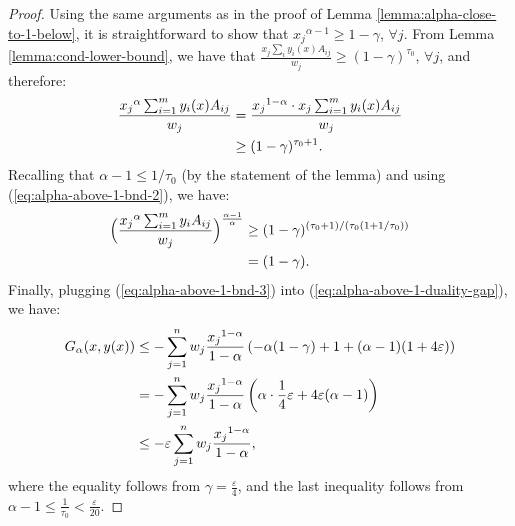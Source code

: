 \documentclass[11pt]{article}
\begin{document}
\begin{proof}
Using the same arguments as in the proof of Lemma \ref{lemma:alpha-close-to-1-below}, it is straightforward to show that ${x_j}^{\alpha-1}\geq 1-\gamma$, $\forall j$. From Lemma \ref{lemma:cond-lower-bound}, we have that $\frac{x_j\sum_{i}y_i(x)A_{ij}}{w_j}\geq (1-\gamma)^{\tau_0}$, $\forall j$, and therefore:
\begin{align}
\frac{{x_j}^{\alpha}\sum_{i=1}^m y_i(x)A_{ij}}{w_j} &= \frac{{x_j}^{1-\alpha}\cdot x_j\sum_{i=1}^my_i(x)A_{ij}}{w_j}\notag\\ 
&\geq (1-\gamma)^{\tau_0 + 1}. \label{eq:alpha-above-1-bnd-2}
\end{align}
Recalling that $\alpha - 1 \leq 1/\tau_0$ (by the statement of the lemma) and using (\ref{eq:alpha-above-1-bnd-2}), we have:
\begin{align}
\Big(\frac{{x_j}^{\alpha}\sum_{i=1}^m y_i A_{ij}}{w_j}\Big)^{\frac{\alpha-1}{\alpha}} &\geq (1-\gamma)^{(\tau_0+1)/(\tau_0(1+1/\tau_0))}\notag\\ 
&=(1-\gamma). \label{eq:alpha-above-1-bnd-3}
\end{align}
Finally, plugging (\ref{eq:alpha-above-1-bnd-3}) into (\ref{eq:alpha-above-1-duality-gap}), we have:
\begin{align}
G_{\alpha}(x, y(x))&\leq -\sum_{j=1}^n w_j \frac{{x_j}^{1-\alpha}}{1-\alpha} \left(-\alpha(1-\gamma) + 1 + (\alpha-1)(1+4\varepsilon)\right)\notag \\
&= -\sum_{j=1}^n w_j \frac{{x_j}^{1-\alpha}}{1-\alpha} \left(\alpha\cdot\frac{1}{4}\varepsilon + 4\varepsilon(\alpha - 1)\right)\notag \\
&\leq -\varepsilon \sum_{j=1}^n w_j \frac{{x_j}^{1-\alpha}}{1-\alpha},
\end{align}
where the equality follows from $\gamma = \frac{\varepsilon}{4}$, and the last inequality follows from $\alpha - 1 \leq \frac{1}{\tau_0} < \frac{\varepsilon}{20}$.
\end{proof}
\fi
\end{document}
